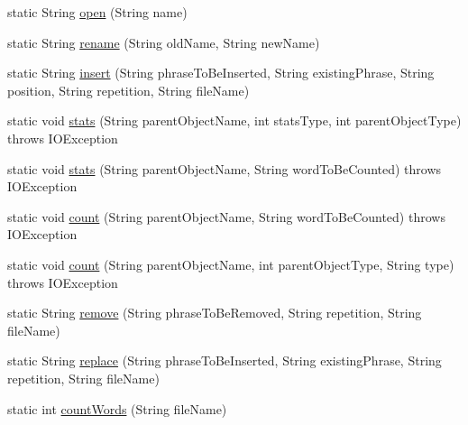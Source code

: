 \begin{DoxyCompactItemize}
static String \hyperlink{classcom_1_1poly_1_1nlp_1_1filekommander_1_1file_1_1actions_1_1_file_action_utils_a7da795595fa0d29e2e237aea97f1840b}{open} (String name)
\item 
static String \hyperlink{classcom_1_1poly_1_1nlp_1_1filekommander_1_1file_1_1actions_1_1_file_action_utils_a195173915a702daa3da1750b7a00bf8f}{rename} (String old\-Name, String new\-Name)
\item 
static String \hyperlink{classcom_1_1poly_1_1nlp_1_1filekommander_1_1file_1_1actions_1_1_file_action_utils_a0f8ca9726628c7fa3b4e191d9c688cba}{insert} (String phrase\-To\-Be\-Inserted, String existing\-Phrase, String position, String repetition, String file\-Name)
\item 
static void \hyperlink{classcom_1_1poly_1_1nlp_1_1filekommander_1_1file_1_1actions_1_1_file_action_utils_ad8d655de0cba854b1c409ed450bbe636}{stats} (String parent\-Object\-Name, int stats\-Type, int parent\-Object\-Type)  throws I\-O\-Exception 
\item 
static void \hyperlink{classcom_1_1poly_1_1nlp_1_1filekommander_1_1file_1_1actions_1_1_file_action_utils_a8ff2b8a44ef71bfb04fb320da780e4eb}{stats} (String parent\-Object\-Name, String word\-To\-Be\-Counted)  throws I\-O\-Exception 
\item 
static void \hyperlink{classcom_1_1poly_1_1nlp_1_1filekommander_1_1file_1_1actions_1_1_file_action_utils_a2df1aca8a703f77ff7ca700541d6fb6b}{count} (String parent\-Object\-Name, String word\-To\-Be\-Counted)  throws I\-O\-Exception 
\item 
static void \hyperlink{classcom_1_1poly_1_1nlp_1_1filekommander_1_1file_1_1actions_1_1_file_action_utils_abda56bf0db7967ce2a92b8be5503150a}{count} (String parent\-Object\-Name, int parent\-Object\-Type, String type)  throws I\-O\-Exception 
\item 
static String \hyperlink{classcom_1_1poly_1_1nlp_1_1filekommander_1_1file_1_1actions_1_1_file_action_utils_abb9025e6066ff691e171546b92c0d04b}{remove} (String phrase\-To\-Be\-Removed, String repetition, String file\-Name)
\item 
static String \hyperlink{classcom_1_1poly_1_1nlp_1_1filekommander_1_1file_1_1actions_1_1_file_action_utils_a7974bd083dd0b112eee6a253c94f281c}{replace} (String phrase\-To\-Be\-Inserted, String existing\-Phrase, String repetition, String file\-Name)
\item 
static int \hyperlink{classcom_1_1poly_1_1nlp_1_1filekommander_1_1file_1_1actions_1_1_file_action_utils_aa776213b3cb78ddde6f89e4b982a8e18}{count\-Words} (String file\-Name)

\end{DoxyCompactItemize}
